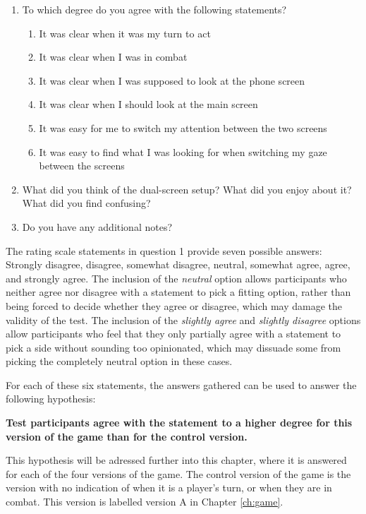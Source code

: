 \begin{enumerate}
	\item To which degree do you agree with the following statements?
	\begin{enumerate}
		\item It was clear when it was my turn to act
		\item It was clear when I was in combat
		\item It was clear when I was supposed to look at the phone screen
		\item It was clear when I should look at the main screen
		\item It was easy for me to switch my attention between the two screens
		\item It was easy to find what I was looking for when switching my gaze between the screens
	\end{enumerate}
	\item What did you think of the dual-screen setup? What did you enjoy about it? What did you find confusing?
	\item Do you have any additional notes?
\end{enumerate}

The rating scale statements in question 1 provide seven possible answers: Strongly disagree, disagree, somewhat disagree, neutral, somewhat agree, agree, and strongly agree. The inclusion of the \textit{neutral} option allows participants who neither agree nor disagree with a statement to pick a fitting option, rather than being forced to decide whether they agree or disagree, which may damage the validity of the test. The inclusion of the \textit{slightly agree} and \textit{slightly disagree} options allow participants who feel that they only partially agree with a statement to pick a side without sounding too opinionated, which may dissuade some from picking the completely neutral option in these cases.

For each of these six statements, the answers gathered can be used to answer the following hypothesis:

\begin{changemargin}{1cm}{1cm}
\textbf{Test participants agree with the statement to a higher degree for this version of the game than for the control version.}
\end{changemargin}

This hypothesis will be adressed further into this chapter, where it is answered for each of the four versions of the game. The control version of the game is the version with no indication of when it is a player's turn, or when they are in combat. This version is labelled version A in Chapter \ref{ch:game}.

